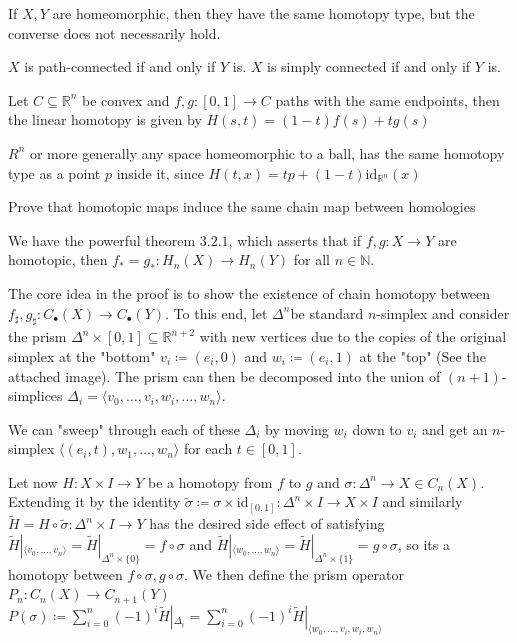 If \( X, Y \) are homeomorphic, then they have the same homotopy type, but the converse does not necessarily hold.

\( X \) is path-connected if and only if \( Y \) is.
\( X \) is simply connected if and only if \( Y \) is.

Let \( C \subseteq \mathbb{R}^n \) be convex and \( f, g : [0, 1] \to C \) paths with the same endpoints, then the
linear homotopy is given by
\( H(s, t) = (1-t)f(s) + tg(s) \)

\( R^n \) or more generally any space homeomorphic to a ball, has the same homotopy type as a point \( p \) inside it, since
\( H(t, x) = tp + (1-t)\text{id}_{\mathbb{R}^n}(x) \)

Prove that homotopic maps induce the same chain map between homologies

We have the powerful theorem \( 3.2.1 \), which asserts that if \( f,g : X \to Y \) are homotopic,
then \( f_{\ast} = g_{\ast} : H_n(X) \to H_n(Y) \) for all \( n \in \mathbb{N} \).

The core idea in the proof is to show the existence of chain homotopy between \( f_{\sharp},g_{\sharp} : C_\bullet(X) \to C_\bullet(Y) \).
To this end, let \( \Delta^n \)be standard \( n \)-simplex and consider the prism \(\Delta^n \times [0, 1] \subseteq \mathbb{R}^{n+2} \)
with new vertices due to the copies of the original simplex at the "bottom" \( v_i \coloneqq  (e_i, 0) \) and \( w_i \coloneqq  (e_i, 1) \) at the "top"
(See the attached image). The prism can then be decomposed into the union of \( (n+1) \)-simplices \( \Delta_i = \langle v_0, \dots, v_i, w_i, \dots, w_n \rangle \).

We can "sweep" through each of these \( \Delta_i \) by moving \( w_i \) down to \( v_i \) and get an \( n \)-simplex
\(\langle (e_i, t), w_1, \dots, w_n \rangle \) for each \( t \in [0, 1] \).

Let now \( H : X \times I \to Y\) be a homotopy from \( f \) to \( g \) and \( \sigma : \Delta^n \to X \in C_n(X) \).
Extending it by the identity \( \tilde{\sigma} \coloneqq \sigma \times \text{id}_{[0, 1]} : \Delta^n \times I \to X \times I \)
and similarly \( \tilde{H} = H \circ \tilde{\sigma} : \Delta^n \times I \to Y \) has the desired side effect of satisfying
\( \tilde{H}|_{\langle v_0, \dots, v_n\rangle} = \tilde{H}|_{\Delta^n \times \{0\}} = f \circ \sigma \) and 
\( \tilde{H}|_{\langle w_0, \dots, w_n\rangle} = \tilde{H}|_{\Delta^n \times \{1\}} = g \circ \sigma \),
so its a homotopy between \( f \circ \sigma, g \circ \sigma \). 
We then define the prism operator \( P_n : C_n(X) \to C_{n+1}(Y) \)
\( P(\sigma) \coloneqq \sum_{i=0}^n (-1)^i \tilde{H}|_{\Delta_i} = \sum_{i=0}^n (-1)^i \tilde{H}|_{\langle w_0, \dots, v_i, w_i, w_n\rangle}\)

